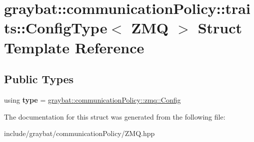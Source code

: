 \hypertarget{structgraybat_1_1communicationPolicy_1_1traits_1_1ConfigType_3_01ZMQ_01_4}{}\section{graybat\+:\+:communication\+Policy\+:\+:traits\+:\+:Config\+Type$<$ Z\+M\+Q $>$ Struct Template Reference}
\label{structgraybat_1_1communicationPolicy_1_1traits_1_1ConfigType_3_01ZMQ_01_4}
\subsection*{Public Types}
\begin{DoxyCompactItemize}
\item 
\hypertarget{structgraybat_1_1communicationPolicy_1_1traits_1_1ConfigType_3_01ZMQ_01_4_a68493a1ed0540a9ee5fbd8d42a49a17b}{}using {\bfseries type} = \hyperlink{structgraybat_1_1communicationPolicy_1_1zmq_1_1Config}{graybat\+::communication\+Policy\+::zmq\+::\+Config}\label{structgraybat_1_1communicationPolicy_1_1traits_1_1ConfigType_3_01ZMQ_01_4_a68493a1ed0540a9ee5fbd8d42a49a17b}

\end{DoxyCompactItemize}


The documentation for this struct was generated from the following file\+:\begin{DoxyCompactItemize}
\item 
include/graybat/communication\+Policy/Z\+M\+Q.\+hpp\end{DoxyCompactItemize}
